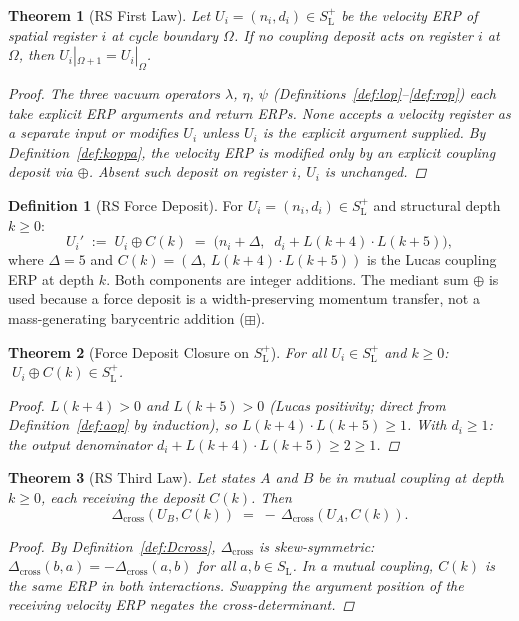 \documentclass[11pt, letterpaper]{article}
\newcommand{\SL}{S_{\mathrm{L}}}
\newcommand{\SLpos}{S_{\mathrm{L}}^{+}}
\newcommand{\lop}{\lambda}
\newcommand{\aop}{\eta}
\newcommand{\bplus}{\boxplus}
\newcommand{\med}{\oplus}
\newcommand{\Dcross}{\Delta_{\mathrm{cross}}}
\theoremstyle{definition}
\newtheorem{definition}{Definition}[section]
\theoremstyle{plain}
\newtheorem{theorem}{Theorem}[section]
\begin{document}
\begin{theorem}[RS First Law]\label{thm:firstlaw}
Let $U_i=(n_i,d_i)\in\SLpos$ be the velocity ERP of spatial register $i$ at
cycle boundary $\Omega$.  If no coupling deposit acts on register $i$ at
$\Omega$, then $U_i|_{\Omega+1}=U_i|_\Omega$.
\begin{proof}
The three vacuum operators $\lop$, $\aop$, $\psi$
(Definitions~\ref{def:lop}--\ref{def:rop}) each take explicit
ERP arguments and return ERPs.  None accepts a velocity register as a
separate input or modifies $U_i$ unless $U_i$ is the explicit argument
supplied.  By Definition~\ref{def:koppa}, the velocity ERP is modified only
by an explicit coupling deposit via $\med$.  Absent such deposit on register
$i$, $U_i$ is unchanged.
\end{proof}
\end{theorem}

\begin{definition}[RS Force Deposit]\label{def:forcedeposit}
For $U_i=(n_i,d_i)\in\SLpos$ and structural depth $k\geq 0$:
\[
U_i'\;:=\;U_i\med C(k)
\;=\;\bigl(n_i+\Delta,\;\;d_i+L(k+4)\cdot L(k+5)\bigr),
\]
where $\Delta=5$ and $C(k)=(\Delta,\,L(k+4)\cdot L(k+5))$ is the Lucas coupling ERP at depth $k$. Both components are integer additions. The mediant sum $\med$ is used because a force deposit is a width-preserving momentum transfer, not a mass-generating barycentric addition ($\bplus$).
\end{definition}

\begin{theorem}[Force Deposit Closure on $\SLpos$]\label{thm:closure}
For all $U_i\in\SLpos$ and $k\geq 0$: $\;U_i\med C(k)\in\SLpos$.
\begin{proof}
$L(k+4)>0$ and $L(k+5)>0$ (Lucas positivity; direct from
Definition~\ref{def:aop} by induction), so $L(k+4)\cdot L(k+5)\geq 1$.
With $d_i\geq 1$: the output denominator $d_i+L(k+4)\cdot L(k+5)\geq 2\geq 1$.
\end{proof}
\end{theorem}

\begin{theorem}[RS Third Law]\label{thm:thirdlaw}
Let states $A$ and $B$ be in mutual coupling at depth $k\geq 0$, each
receiving the deposit $C(k)$.  Then
\[
\Dcross(U_B,C(k))\;=\;-\,\Dcross(U_A,C(k)).
\]
\begin{proof}
By Definition~\ref{def:Dcross}, $\Dcross$ is skew-symmetric:
$\Dcross(b,a)=-\Dcross(a,b)$ for all $a,b\in\SL$.  In a mutual coupling,
$C(k)$ is the same ERP in both interactions.  Swapping the argument position
of the receiving velocity ERP negates the cross-determinant.
\end{proof}
\end{theorem}
\end{document}
